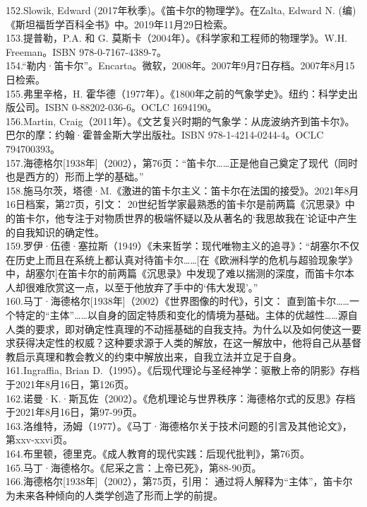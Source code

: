 152.Slowik, Edward (2017年秋季)。《笛卡尔的物理学》。在Zalta, Edward N. (编)《斯坦福哲学百科全书》中。2019年11月29日检索。\\
153.提普勒，P.A. 和 G. 莫斯卡（2004年）。《科学家和工程师的物理学》。W.H. Freeman。ISBN 978-0-7167-4389-7。\\
154.“勒内·笛卡尔”。Encarta。微软，2008年。2007年9月7日存档。2007年8月15日检索。\\
155.弗里辛格，H. 霍华德（1977年）。《1800年之前的气象学史》。纽约：科学史出版公司。ISBN 0-88202-036-6。OCLC 1694190。\\
156.Martin, Craig（2011年）。《文艺复兴时期的气象学：从庞波纳齐到笛卡尔》。巴尔的摩：约翰·霍普金斯大学出版社。ISBN 978-1-4214-0244-4。OCLC 794700393。\\
157.海德格尔[1938年]（2002），第76页：“笛卡尔……正是他自己奠定了现代（同时也是西方的）形而上学的基础。”\\
158.施马尔茨，塔德·M.《激进的笛卡尔主义：笛卡尔在法国的接受》。2021年8月16日档案，第27页，引文：
20世纪哲学家最熟悉的笛卡尔是前两篇《沉思录》中的笛卡尔，他专注于对物质世界的极端怀疑以及从著名的‘我思故我在’论证中产生的自我知识的确定性。\\
159.罗伊·伍德·塞拉斯（1949）《未来哲学：现代唯物主义的追寻》：“胡塞尔不仅在历史上而且在系统上都认真对待笛卡尔……[在《欧洲科学的危机与超验现象学》中，胡塞尔]在笛卡尔的前两篇《沉思录》中发现了难以揣测的深度，而笛卡尔本人却很难欣赏这一点，以至于他放弃了手中的‘伟大发现’。”\\
160.马丁·海德格尔[1938年]（2002）《世界图像的时代》，引文：
直到笛卡尔……一个特定的“主体”……以自身的固定特质和变化的情境为基础。主体的优越性……源自人类的要求，即对确定性真理的不动摇基础的自我支持。为什么以及如何使这一要求获得决定性的权威？这种要求源于人类的解放，在这一解放中，他将自己从基督教启示真理和教会教义的约束中解放出来，自我立法并立足于自身。\\
161.Ingraffia, Brian D.（1995）。《后现代理论与圣经神学：驱散上帝的阴影》存档于2021年8月16日，第126页。\\
162.诺曼·K.·斯瓦佐（2002）。《危机理论与世界秩序：海德格尔式的反思》存档于2021年8月16日，第97-99页。\\
163.洛维特，汤姆（1977）。《马丁·海德格尔关于技术问题的引言及其他论文》，第xxv-xxvi页。\\
164.布里顿，德里克。《成人教育的现代实践：后现代批判》，第76页。\\
165.马丁·海德格尔。《尼采之言：上帝已死》，第88-90页。\\
166.海德格尔[1938年]（2002），第75页，引用：
通过将人解释为“主体”，笛卡尔为未来各种倾向的人类学创造了形而上学的前提。\\
